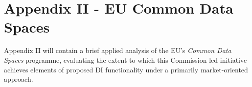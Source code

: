 \chapter*{Appendix II - EU Common Data Spaces}

Appendix II will contain a brief applied analysis of the EU’s \textit{Common Data Spaces} programme, evaluating the extent to which this Commission-led initiative achieves elements of proposed DI functionality under a primarily market-oriented approach.